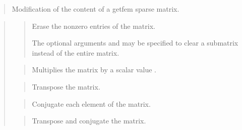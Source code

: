 \documentclass[a4paper,11pt,english]{sphinxmanual}
\begin{document}
\sphinxAtStartPar
{}
\begin{quote}

\sphinxAtStartPar
Modification of the content of a getfem sparse matrix.
\end{quote}

\sphinxAtStartPar
{}
\begin{quote}

\sphinxAtStartPar
{}
\begin{quote}

\sphinxAtStartPar
Erase the non\sphinxhyphen{}zero entries of the matrix.

\sphinxAtStartPar
The optional arguments  and  may be specified to clear a
sub\sphinxhyphen{}matrix instead of the entire matrix.
\end{quote}

\sphinxAtStartPar
{}
\begin{quote}

\sphinxAtStartPar
Multiplies the matrix by a scalar value .
\end{quote}

\sphinxAtStartPar
{}
\begin{quote}

\sphinxAtStartPar
Transpose the matrix.
\end{quote}

\sphinxAtStartPar
{}
\begin{quote}

\sphinxAtStartPar
Conjugate each element of the matrix.
\end{quote}

\sphinxAtStartPar
{}
\begin{quote}

\sphinxAtStartPar
Transpose and conjugate the matrix.
\end{quote}

\sphinxAtStartPar
{}
\begin{quote}


\end{quote}
\end{quote}
\end{document}
